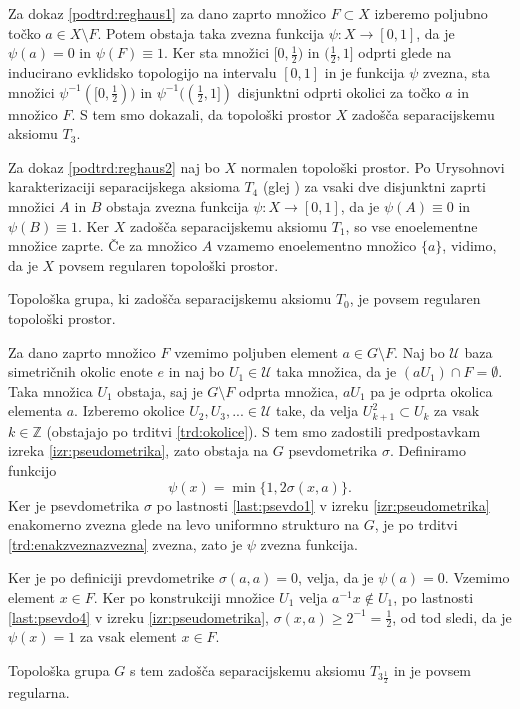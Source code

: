 \documentclass[mat1]{fmfdelo}
\newcommand{\Z}{\mathbb Z}
\newcommand{\Ucurl}{\mathcal{U}}
\begin{document}
\begin{dokaz}
Za dokaz \ref{podtrd:reghaus1} za dano zaprto množico $F \subset X$ izberemo poljubno točko $a \in X \setminus F$. Potem obstaja taka zvezna funkcija $\psi\colon X \to [0, 1]$, da je $\psi(a) = 0$ in $\psi(F) \equiv 1$.
Ker sta množici $[0, \frac{1}{2})$ in $(\frac{1}{2}, 1]$ odprti glede na inducirano evklidsko topologijo na intervalu $[0, 1]$ in je funkcija $\psi$ zvezna, sta množici $\psi^{-1}([0, \frac{1}{2}))$ in $\psi^{-1}((\frac{1}{2}, 1])$ disjunktni odprti okolici za točko $a$ in množico $F$.
S tem smo dokazali, da topološki prostor $X$ zadošča separacijskemu aksiomu $T_3$.

Za dokaz \ref{podtrd:reghaus2} naj bo $X$ normalen topološki prostor. Po Urysohnovi karakterizaciji separacijskega aksioma $T_4$ (glej \cite{bib:top}) za vsaki dve disjunktni zaprti množici $A$ in $B$ obstaja zvezna funkcija $\psi\colon X \to [0, 1]$, da je $\psi(A) \equiv 0 $ in $\psi(B) \equiv 1$. Ker $X$ zadošča separacijskemu aksiomu $T_1$, so vse enoelementne množice zaprte. Če za množico $A$ vzamemo enoelementno množico $\lbrace a \rbrace$, vidimo, da je $X$ povsem regularen topološki prostor.
\end{dokaz}

\begin{izrek}\label{izr:t3pol}
	Topološka grupa, ki zadošča separacijskemu aksiomu $T_0$, je povsem regularen topološki prostor.
\end{izrek}

\begin{dokaz}
Za dano zaprto množico $F$ vzemimo poljuben element $a \in G\setminus F$.
Naj bo $\Ucurl$ baza simetričnih okolic enote $e$ in naj bo $U_1 \in \Ucurl$ taka množica, da je $(aU_1)\cap F = \emptyset$. Taka množica $U_1$ obstaja, saj je $G\setminus F$ odprta množica, $aU_1$ pa je odprta okolica elementa $a$. Izberemo okolice $U_2, U_3,... \in \Ucurl$ take, da velja $U_{k+1}^2 \subset U_k$ za vsak $k \in \Z$ (obstajajo po trditvi \ref{trd:okolice}). S tem smo zadostili predpostavkam izreka \ref{izr:pseudometrika}, zato obstaja na $G$ psevdometrika $\sigma$. Definiramo funkcijo \[ \psi(x) = \min\lbrace 1, 2\sigma(x, a)\rbrace. \] Ker je psevdometrika $\sigma$ po lastnosti \ref{last:psevdo1} v izreku \ref{izr:pseudometrika} enakomerno zvezna glede na levo uniformno strukturo na $G$, je po trditvi \ref{trd:enakzveznazvezna} zvezna, zato je $\psi$ zvezna funkcija.

Ker je po definiciji prevdometrike $\sigma(a, a) = 0$, velja, da je $\psi(a) = 0$.
Vzemimo element $x \in F$. Ker po konstrukciji množice $U_1$ velja $a^{-1}x \notin U_1$, po lastnosti \ref{last:psevdo4} v izreku \ref{izr:pseudometrika}, $\sigma(x, a) \geq 2^{-1} = \frac{1}{2}$, od tod sledi, da je $\psi(x) = 1$ za vsak element $x \in F$.

Topološka grupa $G$ s tem zadošča separacijskemu aksiomu $T_{3\frac{1}{2}}$ in je povsem regularna.
\end{dokaz}
\end{document}
